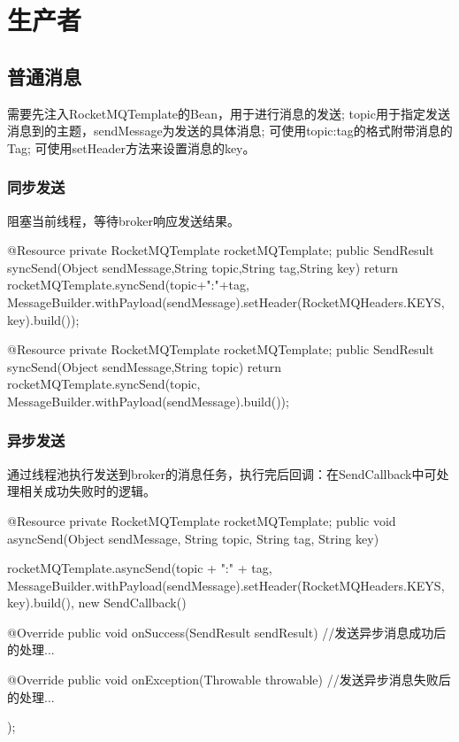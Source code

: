 \documentclass[11pt, a4paper, oneside, fontset=none]{ctexbook}
\begin{document}
\section{生产者}
\subsection{普通消息}
需要先注入RocketMQTemplate的Bean，用于进行消息的发送;
topic用于指定发送消息到的主题，sendMessage为发送的具体消息;
可使用topic:tag的格式附带消息的Tag;
可使用setHeader方法来设置消息的key。

\subsubsection{同步发送}
阻塞当前线程，等待broker响应发送结果。
\begin{java}[caption=普通消息同步发送方式]
@Resource
private RocketMQTemplate rocketMQTemplate;
public SendResult syncSend(Object sendMessage,String topic,String tag,String key) {
  return rocketMQTemplate.syncSend(topic+":"+tag, MessageBuilder.withPayload(sendMessage).setHeader(RocketMQHeaders.KEYS, key).build());
}
\end{java}
\begin{java}[caption=同步发送方式简化版]
@Resource
private RocketMQTemplate rocketMQTemplate;
public SendResult syncSend(Object sendMessage,String topic) {
  return rocketMQTemplate.syncSend(topic, MessageBuilder.withPayload(sendMessage).build());
}
\end{java}

\subsubsection{异步发送}
通过线程池执行发送到broker的消息任务，执行完后回调：在SendCallback中可处理相关成功失败时的逻辑。
\begin{java}[caption=普通消息异步发送方式]
@Resource
private RocketMQTemplate rocketMQTemplate;
public void asyncSend(Object sendMessage, String topic, String tag, String key) {
  rocketMQTemplate.asyncSend(topic + ":" + tag, MessageBuilder.withPayload(sendMessage).setHeader(RocketMQHeaders.KEYS, key).build(), new SendCallback() {
    @Override
    public void onSuccess(SendResult sendResult) {
      //发送异步消息成功后的处理...
    }

    @Override
    public void onException(Throwable throwable) {
      //发送异步消息失败后的处理...
    }
  });
}
\end{java}
\end{document}
